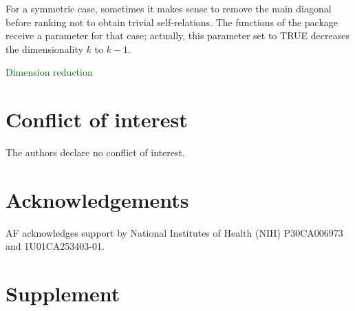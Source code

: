 \documentclass{llncs}
\begin{document}
\textcolor{airforceblue}{For a symmetric case, sometimes it makes sense to remove the main diagonal before ranking not to obtain trivial self-relations. The functions of the package receive a parameter for that case; actually, this parameter set to TRUE decreases the dimensionality $k$ to $k-1$.}

\textcolor{darkgreen}{Dimension reduction}

\section{Conflict of interest}
The authors declare no conflict of interest.

\section{Acknowledgements}
AF acknowledges support by National Institutes of Health (NIH) P30CA006973 and 1U01CA253403-01.





\newcommand{\beginsupplement}{%
        \setcounter{table}{0}
        \renewcommand{\thetable}{S\arabic{table}}%
        \setcounter{figure}{0}
        \renewcommand{\thefigure}{S\arabic{figure}}
        \setcounter{equation}{0}
        \renewcommand{\theequation}{S\arabic{equation}}%
     }

\newpage
\section*{Supplement}
\beginsupplement
\end{document}
